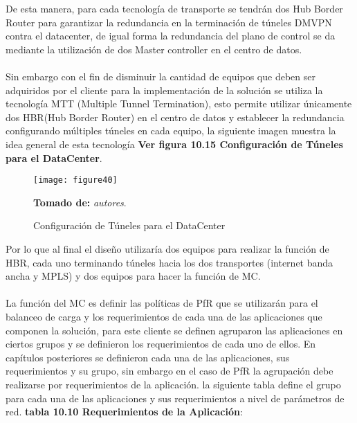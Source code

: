 De esta manera, para cada tecnología de transporte se tendrán dos Hub Border Router para garantizar la redundancia en la terminación de túneles DMVPN contra el datacenter, de igual forma la redundancia del plano de control se da mediante la utilización de dos Master controller en el centro de datos.
\\
\\
Sin embargo con el fin de disminuir la cantidad de equipos que deben ser adquiridos por el cliente para la implementación de la solución se utiliza la tecnología MTT (Multiple Tunnel Termination), esto permite utilizar únicamente dos HBR(Hub Border Router) en el centro de datos y establecer la redundancia configurando múltiples túneles en cada equipo, la siguiente imagen muestra la idea general de esta tecnología \textbf{Ver figura 10.15 Configuración de Túneles para el DataCenter}.

\begin{figure}[htbp]
  \centering
    {\texttt{[image: figure40]}}%
  \caption{Configuración de Túneles para el DataCenter}
   \textbf{Tomado de:} \textit{autores}.
  \label{fig:fig2subfig}
\end{figure}

Por lo que al final el diseño utilizaría dos equipos para realizar la función de HBR, cada uno terminando túneles hacia los dos transportes (internet banda ancha y MPLS) y dos equipos para hacer la función de MC.
\\
\\
La función del MC es definir las políticas de PfR que se utilizarán para el balanceo de carga y los requerimientos de cada una de las aplicaciones que componen la solución, para este cliente se definen agruparon las aplicaciones en ciertos grupos y se definieron los requerimientos de cada uno de ellos. En capítulos posteriores se definieron cada una de las aplicaciones, sus requerimientos y su grupo, sin embargo en el caso de PfR la agrupación debe realizarse por requerimientos de la aplicación. la siguiente tabla define el grupo para cada una de las aplicaciones y sus requerimientos a nivel de parámetros de red.
\textbf{tabla 10.10 Requerimientos de la Aplicación}:


